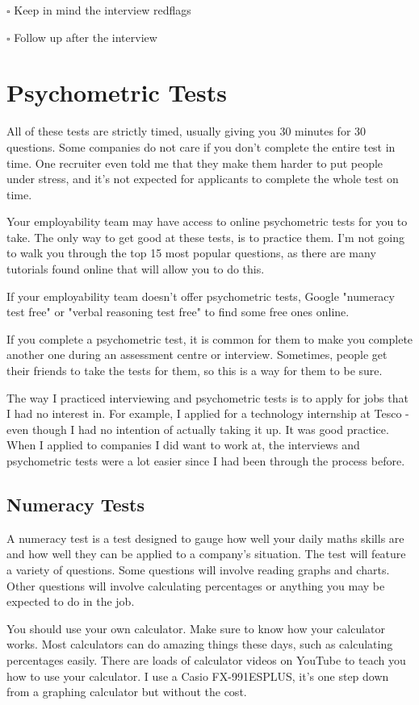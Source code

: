 \documentclass{article}
\begin{document}
$\square$ Keep in mind the interview redflags

$\square$ Follow up after the interview

\section{Psychometric Tests}
All of these tests are strictly timed, usually giving you 30 minutes for
30 questions. Some companies do not care if you don't complete the
entire test in time. One recruiter even told me that they make them
harder to put people under stress, and it's not expected for applicants
to complete the whole test on time.

Your employability team may have access to online psychometric tests for
you to take. The only way to get good at these tests, is to practice
them. I'm not going to walk you through the top 15 most popular
questions, as there are many tutorials found online that will allow you
to do this.

If your employability team doesn't offer psychometric tests, Google
"numeracy test free" or "verbal reasoning test free" to find some
free ones online.

If you complete a psychometric test, it is common for them to make you
complete another one during an assessment centre or interview.
Sometimes, people get their friends to take the tests for them, so this
is a way for them to be sure.

The way I practiced interviewing and psychometric tests is to apply for
jobs that I had no interest in. For example, I applied for a technology
internship at Tesco - even though I had no intention of actually taking
it up. It was good practice. When I applied to companies I did want to
work at, the interviews and psychometric tests were a lot easier since I
had been through the process before.
\subsection{Numeracy Tests}
A numeracy test is a test designed to gauge how well your daily maths
skills are and how well they can be applied to a company's situation.
The test will feature a variety of questions. Some questions will
involve reading graphs and charts. Other questions will involve
calculating percentages or anything you may be expected to do in the
job.

You should use your own calculator. Make sure to know how your
calculator works. Most calculators can do amazing things these days,
such as calculating percentages easily. There are loads of calculator
videos on YouTube to teach you how to use your calculator. I use a Casio
FX-991ESPLUS, it's one step down from a graphing calculator but without
the cost.
\end{document}
